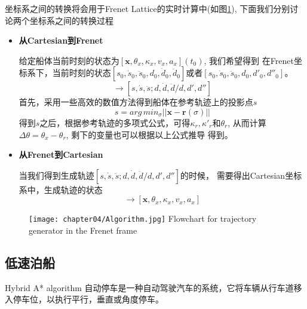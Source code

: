 坐标系之间的转换将会用于Frenet Lattice的实时计算中(如图\ref{fig:frenetalgorithm}),
下面我们分别讨论两个坐标系之间的转换过程
\begin{itemize}
  \item \textbf{从Cartesian到Frenet}

  给定船体当前时刻的状态为$[\bm{x},\theta_x, \kappa_x, v_x, a_x](t_0)$, 我们希望得到
  在Frenet坐标系下，当前时刻的状态$[s_0, \dot{s}_0, \ddot{s}_0, d_0, \dot{d}_0,
  \ddot{d}_0]$或者$[s_0, \dot{s}_0, \ddot{s}_0, d_0, d'_0, d''_0]$。
  \begin{equation}
    [\bm{x}, \theta_x, \kappa_x, v_x, a_x]  \rightarrow
    [s, \dot{s}, \ddot{s}; d, \dot{d},\ddot{d}/d, d', d'']
  \end{equation}
  首先，采用一些高效的数值方法得到船体在参考轨迹上的投影点$s$
  \begin{equation}
    s= arg\,min_{\sigma} || \bm{x}-\bm{r}(\sigma)||
  \end{equation}
  得到$s$之后，根据参考轨迹的多项式公式，可得${\kappa}_r, {\kappa}'_r$和${\theta}_r$,
  从而计算$\Delta \theta = {\theta}_x-{\theta}_r $, 剩下的变量也可以根据以上公式推导
  得到。

  \item \textbf{从Frenet到Cartesian}

  当我们得到生成轨迹$[s, \dot{s}, \ddot{s}; d, \dot{d},\ddot{d}/d, d', d'']$的时候，
  需要得出Cartesian坐标系中，生成轨迹的状态
  \begin{equation}
    [s, \dot{s}, \ddot{s}; d, \dot{d},\ddot{d}/d, d', d''] \rightarrow
    [\bm{x}, \theta_x, \kappa_x, v_x, a_x]
  \end{equation}

\end{itemize}


\begin{figure}[!htp]
  \centering
  \texttt{[image: chapter04/Algorithm.jpg]}
    {Flowchart for trajectory generator in the Frenet frame}
  \label{fig:frenetalgorithm}
\end{figure}


\subsection{低速泊船}
Hybrid A* algorithm
自动停车是一种自动驾驶汽车的系统，它将车辆从行车道移入停车位，以执行平行，垂直或角度停车。



